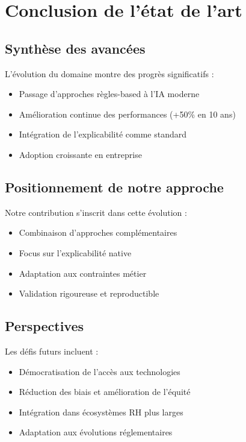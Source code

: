 \documentclass[12pt,a4paper]{report}
\begin{document}
\section{Conclusion de l'état de l'art}

\subsection{Synthèse des avancées}

L'évolution du domaine montre des progrès significatifs :
\begin{itemize}
\item Passage d'approches règles-based à l'IA moderne
\item Amélioration continue des performances (+50\% en 10 ans)
\item Intégration de l'explicabilité comme standard
\item Adoption croissante en entreprise
\end{itemize}

\subsection{Positionnement de notre approche}

Notre contribution s'inscrit dans cette évolution :
\begin{itemize}
\item Combinaison d'approches complémentaires
\item Focus sur l'explicabilité native
\item Adaptation aux contraintes métier
\item Validation rigoureuse et reproductible
\end{itemize}

\subsection{Perspectives}

Les défis futurs incluent :
\begin{itemize}
\item Démocratisation de l'accès aux technologies
\item Réduction des biais et amélioration de l'équité
\item Intégration dans écosystèmes RH plus larges
\item Adaptation aux évolutions réglementaires
\end{itemize}
\end{document}
